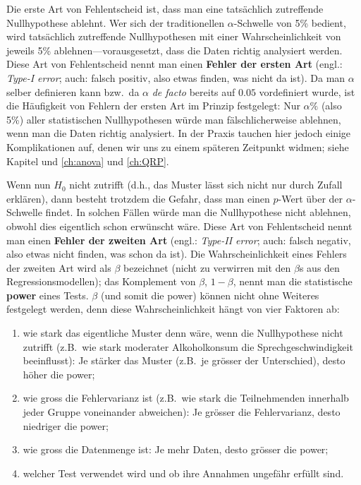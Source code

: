 \documentclass[oneside, 10pt]{book}\usepackage[]{graphicx}\usepackage[]{xcolor}
\begin{document}
Die erste Art von Fehlentscheid ist, dass man eine tatsächlich
zutreffende Nullhypothese ablehnt. Wer sich der traditionellen
$\alpha$-Schwelle von 5\% bedient, wird tatsächlich
zutreffende Nullhypothesen mit einer Wahrscheinlichkeit von
jeweils 5\% ablehnen---vorausgesetzt, dass die Daten richtig
analysiert werden. Diese Art von Fehlentscheid nennt
man einen \textbf{Fehler der ersten Art} (engl.: \textit{Type-I error};
auch: falsch positiv, also etwas finden, was nicht da ist).
Da man $\alpha$ selber definieren kann bzw.\ da $\alpha$
\textit{de facto} bereits auf $0.05$ vordefiniert wurde,
ist die Häufigkeit von Fehlern der ersten Art im Prinzip
festgelegt: Nur $\alpha\%$ (also 5\%) aller statistischen Nullhypothesen
würde man fälschlicherweise ablehnen, wenn man die
Daten richtig analysiert. In der Praxis tauchen
hier jedoch einige Komplikationen auf, denen wir
uns zu einem späteren Zeitpunkt widmen;
siehe Kapitel und \ref{ch:anova} und \ref{ch:QRP}.

Wenn nun $H_0$ nicht zutrifft (d.h., das Muster lässt sich
nicht nur durch Zufall erklären), dann besteht trotzdem
die Gefahr, dass man einen $p$-Wert über der $\alpha$-Schwelle
findet. In solchen Fällen würde man die Nullhypothese nicht ablehnen,
obwohl dies eigentlich schon erwünscht wäre. Diese Art
von Fehlentscheid nennt man einen \textbf{Fehler der zweiten Art}
(engl.: \textit{Type-II error};
auch: falsch negativ, also etwas nicht finden, was schon da ist).
Die Wahrscheinlichkeit eines Fehlers der zweiten Art wird als
$\beta$ bezeichnet (nicht zu verwirren mit den $\beta$s aus
den Regressionsmodellen); das Komplement von $\beta$, $1-\beta$,
nennt man die statistische \textbf{power} eines Tests.
$\beta$ (und somit die power) können nicht ohne Weiteres
festgelegt werden, denn diese Wahrscheinlichkeit hängt von
vier Faktoren ab:

\begin{enumerate}
 \item wie stark das eigentliche Muster denn wäre, wenn die
 Nullhypothese nicht zutrifft (z.B.\ wie stark moderater Alkoholkonsum
 die Sprechgeschwindigkeit beeinflusst): Je stärker das Muster
 (z.B.\ je grösser der Unterschied), desto höher die power;

 \item wie gross die Fehlervarianz ist (z.B.\ wie stark
 die Teilnehmenden innerhalb jeder Gruppe voneinander abweichen): Je grösser
 die Fehlervarianz, desto niedriger die power;

 \item wie gross die Datenmenge ist: Je mehr Daten, desto
 grösser die power;

 \item welcher Test verwendet wird und ob ihre Annahmen
 ungefähr erfüllt sind.
\end{enumerate}
\end{document}
